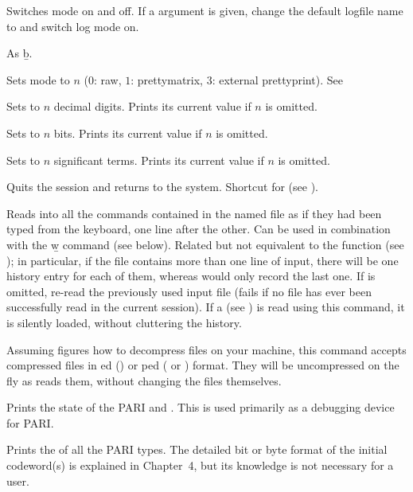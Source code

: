 Switches  mode on and off.
If a  argument is given, change the default logfile name to
 and switch log mode on.

 As \b{b}.

 Sets  mode to $n$ ($0$: raw, $1$:
prettymatrix, $3$: external prettyprint). See 

 Sets  to $n$ decimal digits.
Prints its current value if $n$ is omitted.

 Sets  to $n$ bits.
Prints its current value if $n$ is omitted.

 Sets  to $n$ significant terms.
Prints its current value if $n$ is omitted.

 Quits the  session and returns to the system.
Shortcut for \kbd{()} (see ).

 Reads into  all the
commands contained in the named file as if they had been typed from the
keyboard, one line after the other. Can be used in combination with the \b{w}
command (see below). Related but not equivalent to the function 
(see ); in particular, if the file contains more than one
line of input, there will be one history entry for each of them, whereas
 would only record the last one. If  is omitted,
re-read the previously used input file (fails if no file has ever been
successfully read in the current session). If a  
(see ) is read using this command, it is silently loaded,
without cluttering the history.

Assuming  figures how to decompress files on your machine, this
command accepts compressed files in ed () or
ped ( or ) format. They will be uncompressed on
the fly as  reads them, without changing the files themselves.

 Prints the state of the PARI  and .
This is used primarily as a debugging device for PARI.

 Prints the  of all the PARI
types. The detailed bit or byte format of the initial codeword(s) is
explained in Chapter~4, but its knowledge is not necessary for a 
user.


